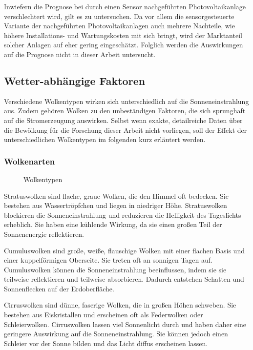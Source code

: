 \documentclass[12pt, a4paper]{article}
\begin{document}
Inwiefern die Prognose bei durch einen Sensor nachgeführten Photovoltaikanlage verschlechtert wird, gilt es zu untersuchen. Da vor allem die sensorgesteuerte Variante der nachgeführten Photovoltaikanlagen auch mehrere Nachteile, wie höhere Installations- und Wartungskosten mit sich bringt, wird der Marktanteil solcher Anlagen auf eher gering eingeschätzt. Folglich werden die Auswirkungen auf die Prognose nicht in dieser Arbeit untersucht.

\subsection{Wetter-abhängige Faktoren}

Verschiedene Wolkentypen wirken sich unterschiedlich auf die Sonneneinstrahlung aus. Zudem gehören Wolken zu den unbeständigen Faktoren, die sich sprunghaft auf die Stromerzeugung auswirken. Selbst wenn exakte, detailreiche Daten über die Bewölkung für die Forschung dieser Arbeit nicht vorliegen, soll der Effekt der unterschiedlichen Wolkentypen im folgenden kurz erläutert werden.

\subsubsection{Wolkenarten}
\label{subsubsec:clouds}

\begin{figure}
\centering
\def\svgwidth{400pt}

\caption{Wolkentypen}
\label{wolkentypen}
\end{figure}


Stratuswolken sind flache, graue Wolken, die den Himmel oft bedecken. Sie bestehen aus Wassertröpfchen und liegen in niedriger Höhe. Stratuswolken blockieren die Sonneneinstrahlung und reduzieren die Helligkeit des Tageslichts erheblich. Sie haben eine kühlende Wirkung, da sie einen großen Teil der Sonnenenergie reflektieren.

Cumuluswolken sind große, weiße, flauschige Wolken mit einer flachen Basis und einer kuppelförmigen Oberseite. Sie treten oft an sonnigen Tagen auf. Cumuluswolken können die Sonneneinstrahlung beeinflussen, indem sie sie teilweise reflektieren und teilweise absorbieren. Dadurch entstehen Schatten und Sonnenflecken auf der Erdoberfläche.

Cirruswolken sind dünne, faserige Wolken, die in großen Höhen schweben. Sie bestehen aus Eiskristallen und erscheinen oft als Federwolken oder Schleierwolken. Cirruswolken lassen viel Sonnenlicht durch und haben daher eine geringere Auswirkung auf die Sonneneinstrahlung. Sie können jedoch einen Schleier vor der Sonne bilden und das Licht diffus erscheinen lassen.
\end{document}
